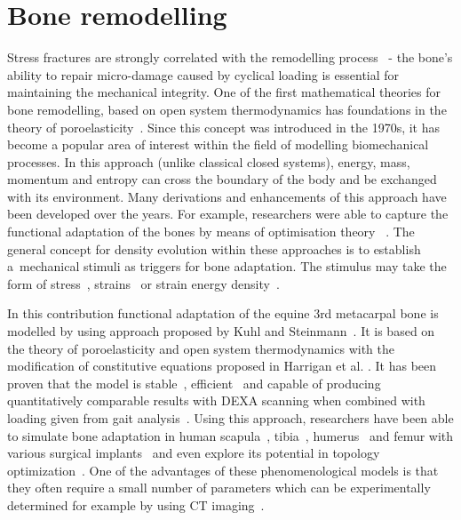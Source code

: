 \documentclass[11pt]{acmeArticle}
\numberwithin{equation}{section}
\begin{document}
\section{Bone remodelling} 
\label{sec:bone_remodel}
Stress fractures are strongly correlated with the remodelling process~\citep{hughes2017role} - the bone's ability to repair micro-damage caused by cyclical loading is essential for maintaining the mechanical integrity. One of the first mathematical theories for bone remodelling, based on open system thermodynamics has foundations in the theory of poroelasticity~\citep{cowin1976bone}. 
Since this concept was introduced in the 1970s, it has become a popular area of interest within the field of modelling biomechanical processes. 
In this approach (unlike classical closed systems), energy, mass, momentum and entropy can cross the boundary of the body and 
be exchanged with its environment. 
Many derivations and enhancements of this approach have been developed over the years. 
For example, researchers were able to capture the functional adaptation of the bones by means of optimisation theory
~\citep{harrigan1996bone, jacobs1995numerical, weinans1992behavior}.
The general concept for density evolution within these approaches is to establish a~mechanical stimuli as triggers for bone adaptation. 
The stimulus may take the form of stress~\citep{beaupre1990approach, carter1996mechanical, doblare2002anisotropic}, strains~\citep{cowin1976bone} or strain energy density~\citep{weinans1992behavior, kuhl2003theory,kaczmarczyk2011efficient, Connor2017bone}. 
 
In this contribution functional adaptation of the equine 3rd metacarpal bone is modelled by using approach proposed by Kuhl and Steinmann~\citep{kuhl2003theory}. 
It is based on the theory of poroelasticity and open system thermodynamics with the modification of constitutive equations proposed in Harrigan et al. 
\citep{harrigan1996bone}. 
It has been proven that the model is stable~\citep{kuhl2003computational}, efficient~\citep{kaczmarczyk2011efficient} and capable of 
producing quantitatively comparable results with DEXA scanning when combined with loading given from gait analysis~\citep{pang2012computational}. 
Using this approach, researchers have been able to simulate bone adaptation in human scapula~\citep{liedtke2017computational}, 
tibia~\citep{pang2012computational}, humerus~\citep{taylor2009phenomenon} and femur with various surgical implants~\citep{ambrosi2011perspectives, Connor2017bone} 
and even explore its potential in topology optimization~\citep{waffenschmidt2012application}. 
One of the advantages of these phenomenological models is that they often require a small number of parameters which can be experimentally
 determined for example by using CT imaging~\citep{zadpoor2013open}.
\end{document}
